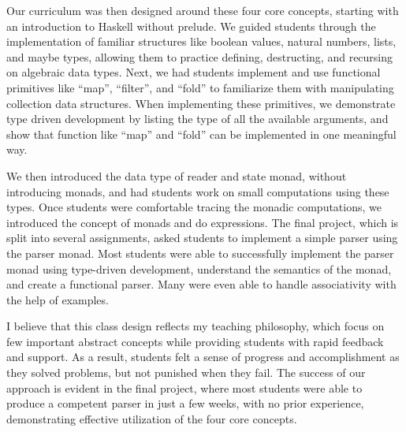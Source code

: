 \documentclass[11pt,a4paper,sans]{moderncv} %
\begin{document}
Our curriculum was then designed around these four core concepts, starting with an introduction to Haskell without prelude. 
We guided students through the implementation of familiar structures like boolean values, natural numbers, lists, and maybe types, allowing them to practice defining, destructing, and recursing on algebraic data types. 
Next, we had students implement and use functional primitives like ``map'', ``filter'', and ``fold'' to familiarize them with manipulating collection data structures.
When implementing these primitives, we demonstrate type driven development by listing the type of all the available arguments, and show that function like ``map'' and ``fold'' can be implemented in one meaningful way.

We then introduced the data type of reader and state monad, without introducing monads, and had students work on small computations using these types. 
Once students were comfortable tracing the monadic computations, we introduced the concept of monads and do expressions. 
The final project, which is split into several assignments, asked students to implement a simple parser using the parser monad. 
Most students were able to successfully implement the parser monad using type-driven development, understand the semantics of the monad, and create a functional parser. 
Many were even able to handle associativity with the help of examples.

I believe that this class design reflects my teaching philosophy, which focus on few important abstract concepts while providing students with rapid feedback and support. 
As a result, students felt a sense of progress and accomplishment as they solved problems, but not punished when they fail. 
The success of our approach is evident in the final project, where most students were able to produce a competent parser in just a few weeks, with no prior experience, demonstrating effective utilization of the four core concepts.

\newpage
\printbibliography %
\end{document}
